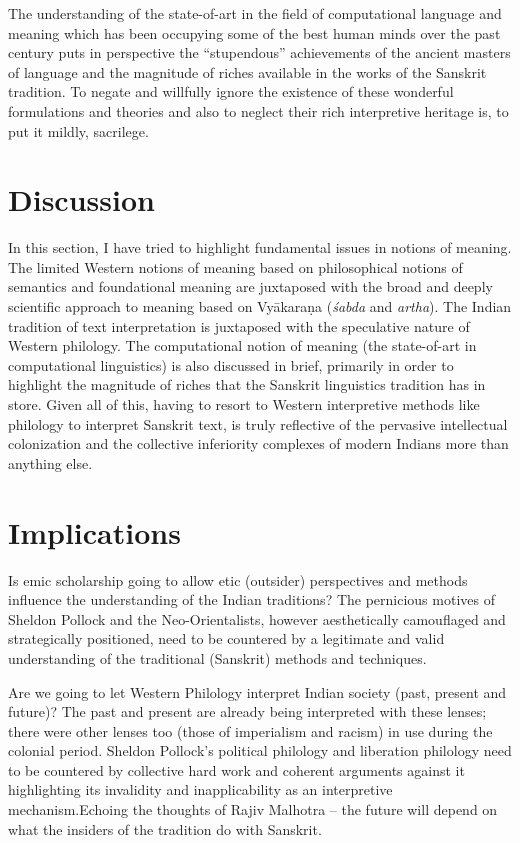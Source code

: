The understanding of the state-of-art in the field of computational language and meaning which has been occupying some of the best human minds over the past century puts in perspective the “stupendous” achievements of the ancient masters of language and the magnitude of riches available in the works of the Sanskrit tradition. To negate and willfully ignore the existence of these wonderful formulations and theories and also to neglect their rich interpretive heritage is, to put it mildly, sacrilege.


\section*{Discussion}

\vskip -7pt

In this section, I have tried to highlight fundamental issues in notions of meaning. The limited Western notions of meaning based on philosophical notions of semantics and foundational meaning are juxtaposed with the broad and deeply scientific approach to meaning based on Vyākaraṇa (\textit{śabda} and \textit{artha}). The Indian tradition of text interpretation is juxtaposed with the speculative nature of Western philology. The computational notion of meaning (the state-of-art in computational linguistics) is also discussed in brief, primarily in order to highlight the magnitude of riches that the Sanskrit linguistics tradition has in store. Given all of this, having to resort to Western interpretive methods like philology to interpret Sanskrit text, is truly reflective of the pervasive intellectual colonization and the collective inferiority complexes of modern Indians more than anything else.


\section*{Implications}

\vskip -7pt

Is emic scholarship going to allow etic (outsider) perspectives and methods influence the understanding of the Indian traditions? The pernicious motives of Sheldon Pollock and the Neo-Orientalists, however aesthetically camouflaged and strategically positioned, need to be countered by a legitimate and valid understanding of the traditional (Sanskrit) methods and techniques.

Are we going to let Western Philology interpret Indian society (past, present and future)? The past and present are already being interpreted with these lenses; there were other lenses too (those of imperialism and racism) in use during the colonial period. Sheldon Pollock’s political philology and liberation philology need to be countered by collective hard work and coherent arguments against it highlighting its invalidity and inapplicability as an interpretive mechanism.Echoing the thoughts of Rajiv Malhotra – the future will depend on what the insiders of the tradition do with Sanskrit.

